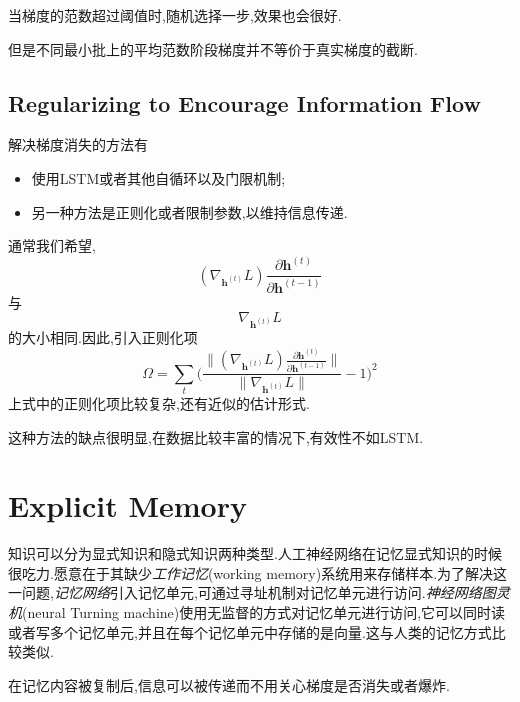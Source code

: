 当梯度的范数超过阈值时,随机选择一步,效果也会很好.

但是不同最小批上的平均范数阶段梯度并不等价于真实梯度的截断.

\subsection{Regularizing to Encourage Information Flow}

解决梯度消失的方法有
\begin{itemize}
    \item 使用LSTM或者其他自循环以及门限机制;
    \item 另一种方法是正则化或者限制参数,以维持信息传递.
\end{itemize}

通常我们希望,
\begin{equation}
(\nabla_{\mathbf h^{(t)}}L)\frac{\partial\mathbf h^{(t)}}{\partial\mathbf h^{(t-1)}}
\end{equation}
与
\begin{equation}
\nabla_{\mathbf h^{(t)}}L
\end{equation}
的大小相同.因此,引入正则化项
\begin{equation}
\Omega=\sum_t\Big(\frac{\|(\nabla_{\mathbf h^{(t)}}L)\frac{\partial\mathbf h^{(t)}}{\partial\mathbf h^{(t-1)}}\|}{\|\nabla_{\mathbf h^{(t)}}L\|}-1\Big)^2
\end{equation}
上式中的正则化项比较复杂,还有近似的估计形式.

这种方法的缺点很明显,在数据比较丰富的情况下,有效性不如LSTM.

\section{Explicit Memory}

知识可以分为显式知识和隐式知识两种类型.人工神经网络在记忆显式知识的时候很吃力.愿意在于其缺少\textit{工作记忆}(working memory)系统用来存储样本.为了解决这一问题,\textit{记忆网络}引入记忆单元,可通过寻址机制对记忆单元进行访问.\textit{神经网络图灵机}(neural Turning machine)使用无监督的方式对记忆单元进行访问,它可以同时读或者写多个记忆单元,并且在每个记忆单元中存储的是向量.这与人类的记忆方式比较类似.

在记忆内容被复制后,信息可以被传递而不用关心梯度是否消失或者爆炸.
